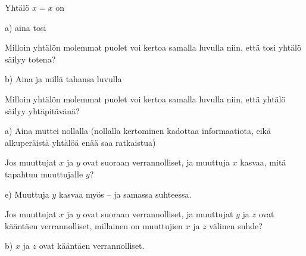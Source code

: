 \begin{tehtava}
Yhtälö $x = x$ on
\begin{vastaus}
a) aina tosi
\end{vastaus}
\end{tehtava}

\begin{tehtava}
Milloin yhtälön molemmat puolet voi kertoa samalla luvulla niin, että tosi yhtälö säilyy totena?
	\begin{vastaus}
b) Aina ja millä tahansa luvulla
	\end{vastaus}
\end{tehtava}

\begin{tehtava}
Milloin yhtälön molemmat puolet voi kertoa samalla luvulla niin, että yhtälö säilyy yhtäpitävänä?
\begin{vastaus}
a) Aina muttei nollalla (nollalla kertominen kadottaa informaatiota, eikä alkuperäistä yhtälöä enää saa ratkaistua)
\end{vastaus}
\end{tehtava}

\begin{tehtava}
Jos muuttujat $x$ ja $y$ ovat suoraan verrannolliset, ja muuttuja $x$ kasvaa, mitä tapahtuu muuttujalle $y$?
\begin{vastaus}
e) Muuttuja $y$ kasvaa myös -- ja samassa suhteessa.
\end{vastaus}
\end{tehtava}

\begin{tehtava}
Jos muuttujat $x$ ja $y$ ovat suoraan verrannolliset, ja muuttujat $y$ ja $z$ ovat kääntäen verrannolliset, millainen on muuttujien $x$ ja $z$ välinen suhde?
	\begin{vastaus}
b) $x$ ja $z$ ovat kääntäen verrannolliset.
	\end{vastaus}
\end{tehtava}

